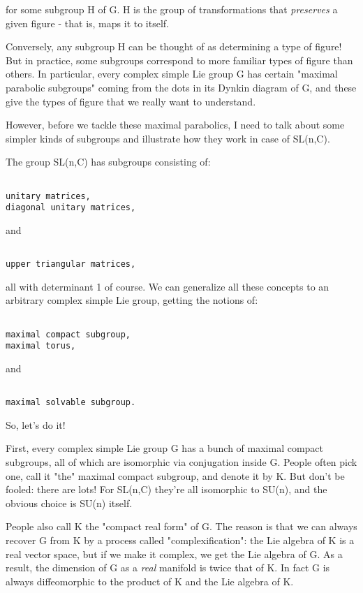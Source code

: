 for some subgroup H of G.  H is the group of transformations
that \emph{preserves} a given figure - that is, maps it to itself.

Conversely, any subgroup H can be thought of as determining a type of
figure!  But in practice, some subgroups correspond to more familiar
types of figure than others.  In particular, every complex simple Lie
group G has certain "maximal parabolic subgroups" coming from the dots 
in its Dynkin diagram of G, and these give the types of figure that we
really want to understand.

However, before we tackle these maximal parabolics, I need to talk 
about some simpler kinds of subgroups and illustrate how they work 
in case of SL(n,C).

The group SL(n,C) has subgroups consisting of:


\begin{verbatim}

unitary matrices, 
diagonal unitary matrices,
\end{verbatim}
    
and


\begin{verbatim}

upper triangular matrices,
\end{verbatim}
    
all with determinant 1 of course.  We can generalize all these concepts
to an arbitrary complex simple Lie group, getting the notions of:


\begin{verbatim}

maximal compact subgroup,
maximal torus, 
\end{verbatim}
    
and


\begin{verbatim}

maximal solvable subgroup.
\end{verbatim}
    
So, let's do it!

First, every complex simple Lie group G has a bunch of maximal compact
subgroups, all of which are isomorphic via conjugation inside G.  People
often pick one, call it "the" maximal compact subgroup, and
denote it by K.  But don't be fooled: there are lots!  For SL(n,C)
they're all isomorphic to SU(n), and the obvious choice is SU(n) itself.

People also call K the "compact real form" of G.  The reason
is that we can always recover G from K by a process called
"complexification": the Lie algebra of K is a real vector
space, but if we make it complex, we get the Lie algebra of G.  As a
result, the dimension of G as a \emph{real} manifold is twice that of K.  
In fact G is always diffeomorphic to the product of K and the Lie algebra
of K.

